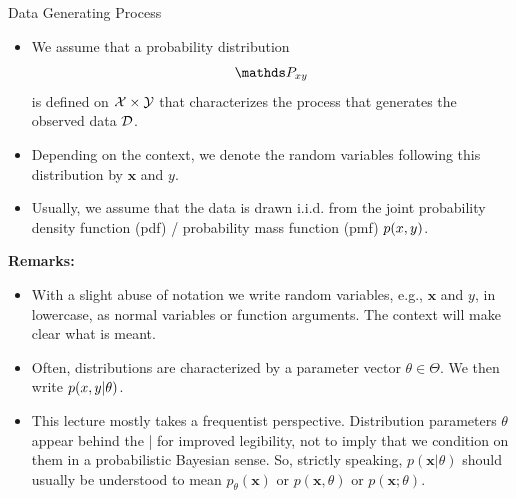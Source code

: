 \documentclass[11pt,compress,t,notes=noshow, xcolor=table]{beamer}
\begin{document}
\begin{vbframe}{Data Generating Process}

\begin{itemize}
\item We assume that a probability distribution
$$
\P_{xy}
$$
is defined on $\mathcal{X} \times \mathcal{Y}$ that characterizes the process that generates the observed data $\mathcal{D}$.
\item Depending on the context, we denote the random variables following this distribution by $\bm{x}$ and $y$.
\item Usually, we assume that the data is drawn i.i.d. from the joint probability density function (pdf) / probability mass function (pmf) $p(x,y)$.
\end{itemize}

\framebreak

\textbf{Remarks:}
\begin{itemize}
\item With a slight abuse of notation we write random variables, e.g., $\bm{x}$ and $y$, in lowercase, as normal
variables or function arguments. The context will make clear what is meant.
\item Often, distributions are characterized by a parameter vector $\theta \in \Theta$. We then write $p(x, y | \theta)$.
\item This lecture mostly takes a frequentist perspective. Distribution parameters $\theta$ appear behind the | for improved legibility, not to imply that we condition on them in a probabilistic Bayesian sense.
So, strictly speaking, $p(\bm{x} | \theta)$ should usually be understood to mean $p_\theta(\bm{x})$ or $p(\bm{x}, \theta)$ or $p(\bm{x}; \theta)$.
\end{itemize}

\end{vbframe}




\endlecture
\end{document}
